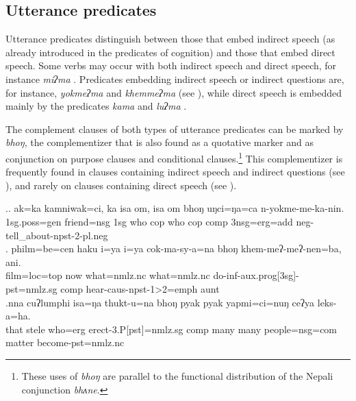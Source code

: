  
\subsection{Utterance predicates}\label{utterance-pred}

Utterance predicates distinguish between those that embed indirect speech (as already introduced in the predicates of cognition) and those that embed direct speech. Some verbs may occur with both  indirect speech and direct speech, for instance \emph{miʔma} . Predicates embedding indirect speech or indirect questions are, for instance, \emph{yokmeʔma}  and \emph{khemmeʔma}   (see \Next), while direct speech is embedded mainly by the predicates  \emph{kama}  and \emph{luʔma} . 

The complement clauses of both types of utterance predicates can be marked by \emph{bhoŋ}, the complementizer that is also found as a quotative marker and as conjunction on purpose clauses and  conditional clauses.\footnote{These uses of \emph{bhoŋ} are parallel to the functional distribution of the  Nepali conjunction \emph{bhʌne}.} This complementizer is frequently found in clauses containing indirect speech and indirect questions (see \Next), and rarely on clauses containing direct speech (see \NNext[e]).  

\ex.\ag. ak=ka kamniwak=ci,  ka isa om,  isa om bhoŋ     uŋci=ŋa=ca  n-yokme-me-ka-nin.\\
  {\sc 1sg.poss=gen} friend{\sc =nsg} {\sc 1sg} who {\sc cop} who {\sc cop} {\sc comp} {\sc 3nsg=erg=add} {\sc neg}-tell\_about-{\sc npst-2-pl.neg}\\
  
\bg. philm=be=cen       haku i=ya       i=ya           cok-ma-sy-a=na        bhoŋ khem-meʔ-meʔ-nen=ba,       ani.\\
film{\sc =loc=top}  now  what{\sc =nmlz.nc} what{\sc =nmlz.nc}  do{\sc -inf-aux.prog[3sg]-pst=nmlz.sg} {\sc comp}  hear{\sc -caus-npst-1>2=emph} aunt\\ 
 
\bg.nna  cuʔlumphi isa=ŋa   thukt-u=na bhoŋ pyak pyak yapmi=ci=nuŋ ceʔya leks-a=ha.\\
that stele who{\sc =erg} erect{\sc -3.P[pst]=nmlz.sg} {\sc comp} many many people{\sc =nsg=com} matter become{\sc [3sg]-pst=nmlz.nc}	\\
 

